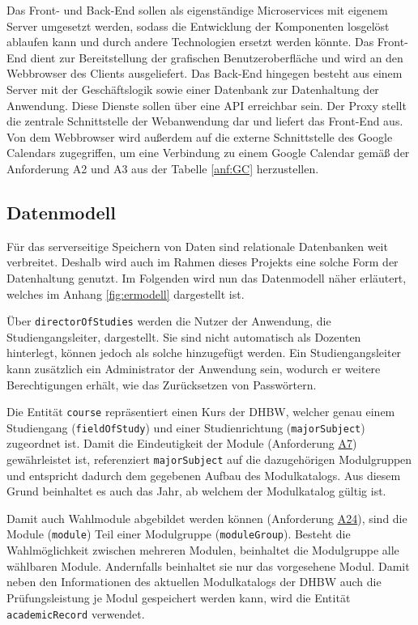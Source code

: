 Das Front- und Back-End sollen als eigenständige Microservices mit eigenem Server umgesetzt werden, sodass die Entwicklung der Komponenten losgelöst ablaufen kann und durch andere Technologien ersetzt werden könnte.
Das Front-End dient zur Bereitstellung der grafischen Benutzeroberfläche und wird an den Webbrowser des Clients ausgeliefert. 
Das Back-End hingegen besteht aus einem Server mit der Geschäftslogik sowie einer Datenbank zur Datenhaltung der Anwendung. 
Diese Dienste sollen über eine \ac{API} erreichbar sein. 
Der Proxy stellt die zentrale Schnittstelle der Webanwendung dar und liefert das Front-End aus. 
Von dem Webbrowser wird außerdem auf die externe Schnittstelle des Google Calendars zugegriffen, um eine Verbindung zu einem Google Calendar gemäß der Anforderung A2 und A3 aus der Tabelle \vref{anf:GC} herzustellen.


\subsection{Datenmodell}
Für das serverseitige Speichern von Daten sind relationale Datenbanken weit verbreitet.
Deshalb wird auch im Rahmen dieses Projekts eine solche Form der Datenhaltung genutzt.
Im Folgenden wird nun das Datenmodell näher erläutert, welches im Anhang \ref{fig:ermodell} dargestellt ist.  

Über \texttt{directorOfStudies} werden die Nutzer der Anwendung, die Studiengangsleiter, dargestellt.
Sie sind nicht automatisch als Dozenten hinterlegt, können jedoch als solche hinzugefügt werden.
Ein Studiengangsleiter kann zusätzlich ein Administrator der Anwendung sein, wodurch er weitere Berechtigungen erhält, wie das Zurücksetzen von Passwörtern.

Die Entität \texttt{course} repräsentiert einen Kurs der \ac{DHBW}, welcher genau einem Studiengang (\texttt{fieldOfStudy}) und einer Studienrichtung (\texttt{majorSubject}) zugeordnet ist.
Damit die Eindeutigkeit der Module (Anforderung \hyperref[tab:Anforderungen]{A7}) gewährleistet ist, referenziert \texttt{majorSubject} auf die dazugehörigen Modulgruppen und entspricht dadurch dem gegebenen Aufbau des Modulkatalogs.
Aus diesem Grund beinhaltet es auch das Jahr, ab welchem der Modulkatalog gültig ist. 

Damit auch Wahlmodule abgebildet werden können (Anforderung \hyperref[tab:Anforderungen]{A24}), sind die Module (\texttt{module}) Teil einer Modulgruppe (\texttt{moduleGroup}).
Besteht die Wahlmöglichkeit zwischen mehreren Modulen, beinhaltet die Modulgruppe alle wählbaren Module.
Andernfalls beinhaltet sie nur das vorgesehene Modul.
Damit neben den Informationen des aktuellen Modulkatalogs der \ac{DHBW} auch die Prüfungsleistung je Modul gespeichert werden kann, wird die Entität \texttt{academicRecord} verwendet.

